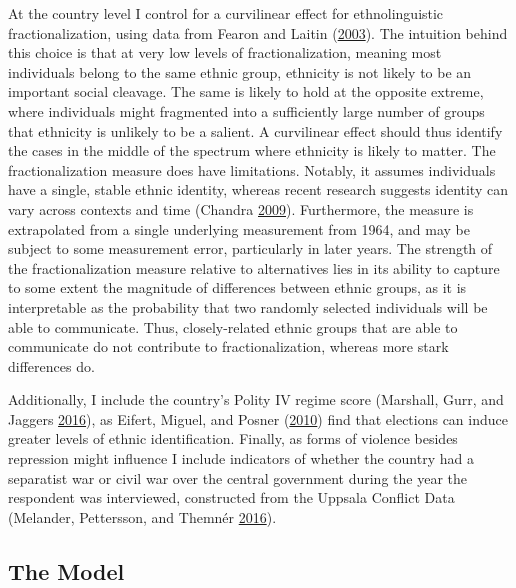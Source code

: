 \documentclass[12pt,]{book}
\theoremstyle{definition}
\theoremstyle{definition}
\theoremstyle{definition}
\theoremstyle{remark}
\begin{document}
At the country level I control for a curvilinear effect for
ethnolinguistic fractionalization, using data from Fearon and Laitin
(\protect\hyperlink{ref-fearonlaitin03}{2003}). The intuition behind
this choice is that at very low levels of fractionalization, meaning
most individuals belong to the same ethnic group, ethnicity is not
likely to be an important social cleavage. The same is likely to hold at
the opposite extreme, where individuals might fragmented into a
sufficiently large number of groups that ethnicity is unlikely to be a
salient. A curvilinear effect should thus identify the cases in the
middle of the spectrum where ethnicity is likely to matter. The
fractionalization measure does have limitations. Notably, it assumes
individuals have a single, stable ethnic identity, whereas recent
research suggests identity can vary across contexts and time (Chandra
\protect\hyperlink{ref-Chandra2009a}{2009}). Furthermore, the measure is
extrapolated from a single underlying measurement from 1964, and may be
subject to some measurement error, particularly in later years. The
strength of the fractionalization measure relative to alternatives lies
in its ability to capture to some extent the magnitude of differences
between ethnic groups, as it is interpretable as the probability that
two randomly selected individuals will be able to communicate. Thus,
closely-related ethnic groups that are able to communicate do not
contribute to fractionalization, whereas more stark differences do.

Additionally, I include the country's Polity IV regime score (Marshall,
Gurr, and Jaggers \protect\hyperlink{ref-Marshall2016}{2016}), as
Eifert, Miguel, and Posner (\protect\hyperlink{ref-Eifert2010}{2010})
find that elections can induce greater levels of ethnic identification.
Finally, as forms of violence besides repression might influence I
include indicators of whether the country had a separatist war or civil
war over the central government during the year the respondent was
interviewed, constructed from the Uppsala Conflict Data (Melander,
Pettersson, and Themnér \protect\hyperlink{ref-Melander2016}{2016}).

\hypertarget{the-model}{%
\subsection{The Model}\label{the-model}}
\end{document}
